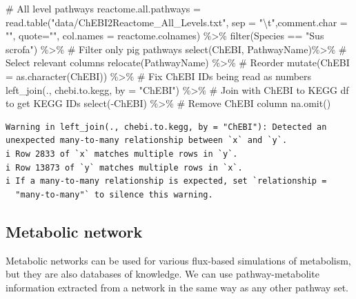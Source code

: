 \documentclass[
  24px,
  letterpaper,
  DIV=11,
  numbers=noendperiod]{scrartcl}
\newenvironment{Shaded}{\begin{snugshade}}{\end{snugshade}}
\newcommand{\AttributeTok}[1]{\textcolor[rgb]{0.40,0.45,0.13}{#1}}
\newcommand{\CommentTok}[1]{\textcolor[rgb]{0.37,0.37,0.37}{#1}}
\newcommand{\FunctionTok}[1]{\textcolor[rgb]{0.28,0.35,0.67}{#1}}
\newcommand{\NormalTok}[1]{\textcolor[rgb]{0.00,0.23,0.31}{#1}}
\newcommand{\OtherTok}[1]{\textcolor[rgb]{0.00,0.23,0.31}{#1}}
\newcommand{\SpecialCharTok}[1]{\textcolor[rgb]{0.37,0.37,0.37}{#1}}
\newcommand{\StringTok}[1]{\textcolor[rgb]{0.13,0.47,0.30}{#1}}
\begin{document}
\begin{Shaded}
\begin{Highlighting}[]
\CommentTok{\# All level pathways}
\NormalTok{reactome.all.pathways }\OtherTok{=} \FunctionTok{read.table}\NormalTok{(}\StringTok{"data/ChEBI2Reactome\_All\_Levels.txt"}\NormalTok{, }\AttributeTok{sep =} \StringTok{"}\SpecialCharTok{\textbackslash{}t}\StringTok{"}\NormalTok{,}\AttributeTok{comment.char =} \StringTok{""}\NormalTok{, }\AttributeTok{quote=}\StringTok{""}\NormalTok{, }\AttributeTok{col.names =}\NormalTok{ reactome.colnames) }\SpecialCharTok{\%\textgreater{}\%} 
  \FunctionTok{filter}\NormalTok{(Species }\SpecialCharTok{==} \StringTok{"Sus scrofa"}\NormalTok{) }\SpecialCharTok{\%\textgreater{}\%} \CommentTok{\# Filter only pig pathways}
  \FunctionTok{select}\NormalTok{(ChEBI, PathwayName)}\SpecialCharTok{\%\textgreater{}\%} \CommentTok{\# Select relevant columns}
  \FunctionTok{relocate}\NormalTok{(PathwayName) }\SpecialCharTok{\%\textgreater{}\%} \CommentTok{\# Reorder}
  \FunctionTok{mutate}\NormalTok{(}\AttributeTok{ChEBI =} \FunctionTok{as.character}\NormalTok{(ChEBI)) }\SpecialCharTok{\%\textgreater{}\%} \CommentTok{\# Fix ChEBI IDs being read as numbers}
  \FunctionTok{left\_join}\NormalTok{(., chebi.to.kegg, }\AttributeTok{by =} \StringTok{"ChEBI"}\NormalTok{) }\SpecialCharTok{\%\textgreater{}\%} \CommentTok{\# Join with ChEBI to KEGG df to get KEGG IDs}
  \FunctionTok{select}\NormalTok{(}\SpecialCharTok{{-}}\NormalTok{ChEBI) }\SpecialCharTok{\%\textgreater{}\%} \CommentTok{\# Remove ChEBI column}
  \FunctionTok{na.omit}\NormalTok{()}
\end{Highlighting}
\end{Shaded}

\begin{verbatim}
Warning in left_join(., chebi.to.kegg, by = "ChEBI"): Detected an unexpected many-to-many relationship between `x` and `y`.
i Row 2833 of `x` matches multiple rows in `y`.
i Row 13873 of `y` matches multiple rows in `x`.
i If a many-to-many relationship is expected, set `relationship =
  "many-to-many"` to silence this warning.
\end{verbatim}

\hypertarget{metabolic-network}{%
\subsection{Metabolic network}\label{metabolic-network}}

Metabolic networks can be used for various flux-based simulations of
metabolism, but they are also databases of knowledge. We can use
pathway-metabolite information extracted from a network in the same way
as any other pathway set.
\end{document}
